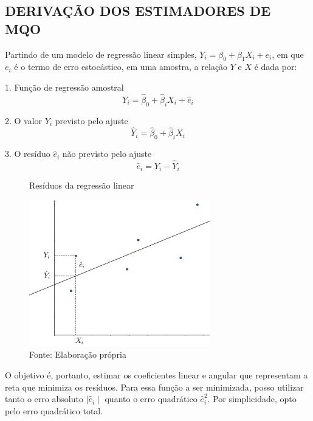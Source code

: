 
\begin{apendicesenv}
\partapendices

\chapter{DERIVAÇÃO DOS ESTIMADORES DE MQO} \label{apendice_mqo}

Partindo de um modelo de regressão linear simples, $Y_i = \beta_0 + \beta_1X_i + e_i$, em que $e_i$ é o termo de erro estocástico, em uma amostra, a relação $Y$ e $X$ é dada por:

1. Função de regressão amostral
\begin{equation}
Y_i = \hat{\beta}_0 + \hat{\beta}_iX_i + \hat{e}_i
\end{equation}

2. O valor $Y_i$ previsto pelo ajuste
\begin{equation}
\hat{Y}_i = \hat{\beta}_0 + \hat{\beta}_iX_i
\end{equation}

3. O resíduo $\hat{e}_i$ não previsto pelo ajuste
\begin{equation}
\hat{e}_i = Y_i - \hat{Y}_i
\end{equation}

\begin{figure}[H]
\centering
\caption{Resíduos da regressão linear}
\includegraphics[width=0.7\textwidth]{img/appendix_b_1.png}
\caption*{Fonte: Elaboração própria}
\end{figure}

O objetivo é, portanto, estimar os coeficientes linear e angular que representam a reta que minimiza os resíduos. Para essa função a ser minimizada, posso utilizar tanto o erro absoluto $\mid \hat{e}_i \mid$ quanto o erro quadrático $\hat{e}_i^2$. Por simplicidade, opto pelo erro quadrático total.


\end{apendicesenv}
